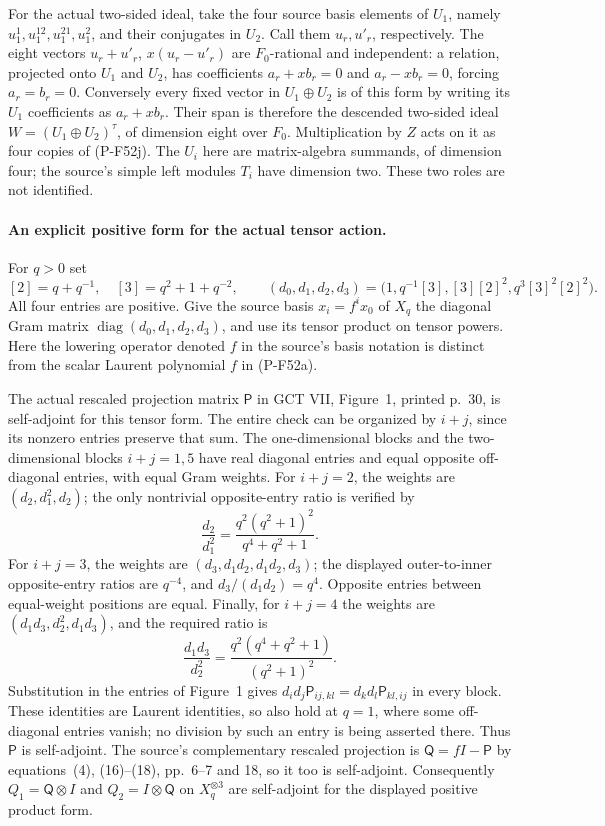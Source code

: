 For the actual two-sided ideal, take the four source basis elements
of $U_1$, namely $u_1^1,u_1^{12},u_1^{21},u_1^2$, and their
conjugates in $U_2$. Call them $u_r,u'_r$, respectively.
The eight vectors $u_r+u'_r$, $x(u_r-u'_r)$ are $F_0$-rational
and independent: a relation, projected onto $U_1$ and $U_2$,
has coefficients $a_r+xb_r=0$ and $a_r-xb_r=0$, forcing
$a_r=b_r=0$. Conversely every fixed vector in
$U_1\oplus U_2$ is of this form by writing its $U_1$ coefficients
as $a_r+xb_r$. Their span is therefore the descended two-sided
ideal $W=(U_1\oplus U_2)^\tau$, of dimension eight over $F_0$.
Multiplication by $Z$ acts on it as four copies of (P-F52j).
The $U_i$ here are matrix-algebra summands, of dimension four;
the source's simple left modules $T_i$ have dimension two.
These two roles are not identified.

\paragraph{An explicit positive form for the actual tensor action.}
For $q>0$ set
\[
 [2]=q+q^{-1},\quad [3]=q^2+1+q^{-2},\qquad
 (d_0,d_1,d_2,d_3)
       =\bigl(1,q^{-1}[3],[3][2]^2,q^3[3]^2[2]^2\bigr).
                                                               \tag{P-F52k}
\]
All four entries are positive. Give the source basis
$x_i=f^ix_0$ of $X_q$ the diagonal Gram matrix
$\operatorname{diag}(d_0,d_1,d_2,d_3)$, and use its tensor
product on tensor powers. Here the lowering operator denoted
$f$ in the source's basis notation is distinct from the scalar
Laurent polynomial $f$ in (P-F52a).

The actual rescaled projection matrix $\mathsf P$ in GCT VII,
Figure~1, printed p.~30, is self-adjoint for this tensor form.
The entire check can be organized by $i+j$, since its nonzero
entries preserve that sum. The one-dimensional blocks and the
two-dimensional blocks $i+j=1,5$ have real diagonal entries
and equal opposite off-diagonal entries, with equal Gram weights.
For $i+j=2$, the weights are $(d_2,d_1^2,d_2)$; the only
nontrivial opposite-entry ratio is verified by
\[
 \frac{d_2}{d_1^2}
       =\frac{q^2(q^2+1)^2}{q^4+q^2+1}.
\]
For $i+j=3$, the weights are
$(d_3,d_1d_2,d_1d_2,d_3)$; the displayed outer-to-inner
opposite-entry ratios are $q^{-4}$, and
$d_3/(d_1d_2)=q^4$. Opposite entries between equal-weight
positions are equal. Finally, for $i+j=4$ the weights are
$(d_1d_3,d_2^2,d_1d_3)$, and the required ratio is
\[
 \frac{d_1d_3}{d_2^2}
       =\frac{q^2(q^4+q^2+1)}{(q^2+1)^2}.
\]
Substitution in the entries of Figure~1 gives
$d_id_j\mathsf P_{ij,kl}=d_kd_l\mathsf P_{kl,ij}$
in every block. These identities are Laurent identities,
so also hold at $q=1$, where some off-diagonal entries vanish;
no division by such an entry is being asserted there.
Thus $\mathsf P$ is self-adjoint. The source's complementary
rescaled projection is $\mathsf Q=fI-\mathsf P$ by
equations~(4), (16)--(18), pp.~6--7 and 18, so it too is
self-adjoint. Consequently $Q_1=\mathsf Q\otimes I$ and
$Q_2=I\otimes\mathsf Q$ on $X_q^{\otimes3}$ are
self-adjoint for the displayed positive product form.

